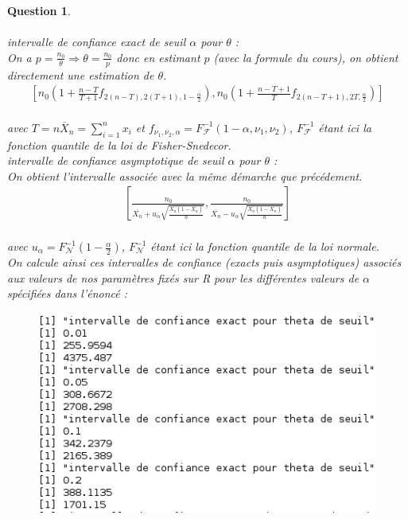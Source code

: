 \documentclass[a4paper,11pt]{article}
\newtheorem{exo1}{Question}
\begin{document}
\begin{exo1} \ \\ \\
intervalle de confiance exact de seuil $\alpha$ pour $\theta$ : \ \\
On a $p=\frac{n_{0}}{\theta} \Rightarrow \theta=\frac{n_{0}}{p}$ donc en estimant $p$ (avec la formule du cours), on obtient directement une estimation de $\theta$.
\begin{equation}
\begin{aligned}
\left[ n_{0}(1+\frac{n-T}{T+1}f_{2(n-T),2(T+1),1-\frac{\alpha}{2}}),n_{0}(1+\frac{n-T+1}{T}f_{2(n-T+1),2T,\frac{\alpha}{2}})\right]
\end{aligned}
\end{equation} \ \\
avec $T=n\overline{X}_{n}=\sum\limits_{i=1}^{n} x_{i}$ et $f_{\nu_{1},\nu_{2},\alpha} = F_{\mathscr{F}}^{-1}(1-\alpha,\nu_{1},\nu_{2})$, $F_{\mathscr{F}}^{-1}$ étant ici la fonction quantile de la loi de Fisher-Snedecor. \ \\
intervalle de confiance asymptotique de seuil $\alpha$ pour $\theta$ : \ \\
On obtient l'intervalle associée avec la même démarche que précédement.
\begin{equation}
\begin{aligned}
\left[ \frac{n_{0}}{\overline{X_{n}}+u_{\alpha}\sqrt{\frac{\overline{X_{n}}(1-\overline{X_{n}})}{n}}},\frac{n_{0}}{\overline{X_{n}}-u_{\alpha}\sqrt{\frac{\overline{X_{n}}(1-\overline{X_{n}})}{n}}}\right]
\end{aligned}
\end{equation} \ \\
avec $u_{\alpha}=F_{\mathscr{N}}^{-1}(1-\frac{\alpha}{2})$, $F_{\mathscr{N}}^{-1}$ étant ici la fonction quantile de la loi normale. \ \\
On calcule ainsi ces intervalles de confiance (exacts puis asymptotiques) associés aux valeurs de nos paramètres fixés sur R pour les différentes valeurs de $\alpha$ spécifiées dans l'énoncé :
\begin{figure}[h]
\includegraphics[scale=0.7]{images/Q1_4_exact.png}

\end{figure}
\end{exo1}
\end{document}
